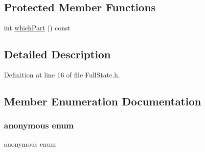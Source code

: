 \subsection*{Protected Member Functions}
\begin{DoxyCompactItemize}
\item 
int \hyperlink{classocra_1_1FullState_a75ec7c039df8cb8608ebf34f7b779be5}{which\+Part} () const
\end{DoxyCompactItemize}


\subsection{Detailed Description}


Definition at line 16 of file Full\+State.\+h.



\subsection{Member Enumeration Documentation}
\hypertarget{classocra_1_1FullState_a8623fb06b8930505d950f7651e75b519}{}\label{classocra_1_1FullState_a8623fb06b8930505d950f7651e75b519} 
\subsubsection{\texorpdfstring{anonymous enum}{anonymous enum}}
{\footnotesize\ttfamily anonymous enum}

